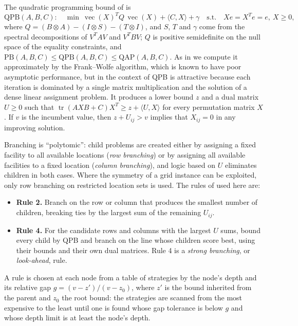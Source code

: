 \documentclass[10pt]{article}
\theoremstyle{remark}
\newcommand{\tr}{\operatorname{tr}}
\newcommand{\vecop}{\operatorname{vec}}
\newcommand{\inner}[2]{\langle #1, #2\rangle}
\newcommand{\QPB}{\mathrm{QPB}}
\begin{document}
The quadratic programming bound of \cite{ab01} is
\[
  \QPB(A,B,C):\quad \min\ \vecop(X)^TQ\,\vecop(X) + \inner{C}{X} + \gamma
  \quad\text{s.t.}\quad Xe = X^Te = e,\ X\ge0,
\]
where $Q = (B\otimes A) - (I\otimes S) - (T\otimes I)$, and $S$, $T$ and $\gamma$
come from the spectral decompositions of $V^TAV$ and $V^TBV$; $Q$ is positive
semidefinite on the null space of the equality constraints, and
$\mathrm{PB}(A,B,C)\le\QPB(A,B,C)\le\mathrm{QAP}(A,B,C)$. As in \cite{ba01,abgl} we
compute it approximately by the Frank--Wolfe algorithm, which is known to have poor
asymptotic performance, but in the context of QPB is attractive because each
iteration is dominated by a single matrix multiplication and the solution of a
dense linear assignment problem. It produces a lower bound $z$ and a dual matrix
$U\ge0$ such that $\tr(AXB+C)X^T \ge z + \inner{U}{X}$ for every permutation matrix
$X$. If $v$ is the incumbent value, then $z + U_{ij} > v$ implies that $X_{ij} = 0$ in
any improving solution.

Branching is ``polytomic'': child problems are created either by assigning a fixed
facility to all available locations (\emph{row branching}) or by assigning all
available facilities to a fixed location (\emph{column branching}), and logic based
on $U$ eliminates children in both cases. Where the symmetry of a grid instance can
be exploited, only row branching on restricted location sets is used. The rules of
\cite{abgl} used here are:
\begin{itemize}
\item[] \textbf{Rule 2.} Branch on the row or column that produces the smallest
  number of children, breaking ties by the largest sum of the remaining $U_{ij}$.
\item[] \textbf{Rule 4.} For the candidate rows and columns with the largest $U$
  sums, bound every child by QPB and branch on the line whose children score best,
  using their bounds and their own dual matrices. Rule 4 is a \emph{strong
  branching}, or \emph{look-ahead}, rule.
\end{itemize}
A rule is chosen at each node from a table of strategies by the node's depth and
its relative gap $g = (v - z')/(v - z_0)$, where $z'$ is the bound inherited from
the parent and $z_0$ the root bound: the strategies are scanned from the most
expensive to the least until one is found whose gap tolerance is below $g$ and
whose depth limit is at least the node's depth.
\end{document}
